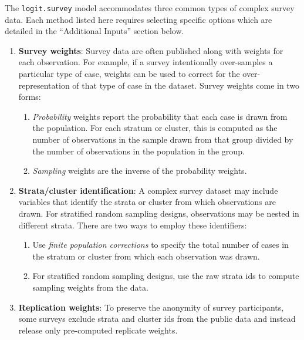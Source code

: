 The {\tt logit.survey} model accommodates three common types of 
complex survey data.  Each method listed here requires selecting 
specific options which are detailed in the ``Additional Inputs'' 
section below.  \begin{enumerate}

\item \textbf{Survey weights}:  Survey data are often published along
with weights for each observation.  For example, if a survey
intentionally over-samples a particular type of case, weights can be
used to correct for the over-representation of that type of case in
the dataset. Survey weights come in two forms:
\begin{enumerate}

\item \textit{Probability} weights report the probability that each
case is drawn from the population.  For each stratum or cluster, 
this is computed as the number of observations in the sample drawn 
from that group divided by the number of observations in the 
population in the group.

\item \textit{Sampling} weights are the inverse of the probability
weights.   

\end{enumerate}

\item \textbf{Strata/cluster identification}:  A complex survey 
dataset may include variables that identify the strata or cluster 
from which observations are drawn.  For stratified random sampling 
designs, observations may be nested in different strata.  There are 
two ways to employ these identifiers:

\begin{enumerate}

\item Use \textit{finite population corrections} to specify the
total number of cases in the stratum or cluster from which each
observation was drawn.

\item For stratified random sampling designs, use the raw strata ids
to compute sampling weights from the data.

\end{enumerate}

\item \textbf{Replication weights}: To preserve the anonymity of
survey participants, some surveys exclude strata and cluster ids 
from the public data and instead release only pre-computed replicate 
weights.

\end{enumerate}

